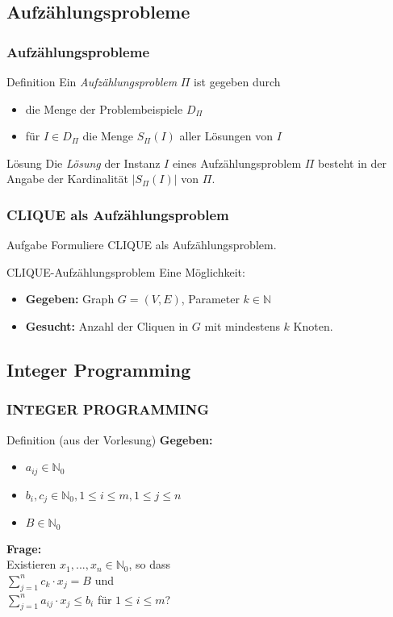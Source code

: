 \documentclass{beamer}
\begin{document}
{ \subsection{Aufzählungsprobleme}
\begin{frame}
 \frametitle{Aufzählungsprobleme}
 \begin{block}{Definition}
  Ein \emph{Aufzählungsproblem} $\Pi$ ist gegeben durch
  \begin{itemize}
   \item die Menge der Problembeispiele $D_\Pi$
   \item für $I \in D_\Pi$ die Menge $S_\Pi(I)$ aller Lösungen von $I$
  \end{itemize}
  \end{block}
  \begin{block}{Lösung}  
  Die \emph{Lösung} der Instanz $I$ eines Aufzählungsproblem $\Pi$ besteht in der Angabe der Kardinalität $|S_\Pi(I)|$ von $\Pi$.
 \end{block}
\end{frame}

 \begin{frame}
 \frametitle{CLIQUE als Aufzählungsproblem}
  \begin{block}{Aufgabe}
  Formuliere CLIQUE als Aufzählungsproblem.
\end{block}
\pause
\begin{block}{CLIQUE-Aufzählungsproblem}
Eine Möglichkeit:
\begin{itemize}
 \item \textbf{Gegeben: } Graph $G = (V,E)$, Parameter $k\in \mathbb{N}$
 \item \textbf{Gesucht: } Anzahl der Cliquen in $G$ mit mindestens $k$ Knoten.
 \end{itemize}
\end{block}
\end{frame}

\subsection{Integer Programming}
\begin{frame}
 \frametitle{INTEGER PROGRAMMING}
 \begin{block}{Definition (aus der Vorlesung)}
 \textbf{Gegeben: }
 \begin{itemize}
  \item $a_{ij} \in \mathbb{N}_0$
  \item $b_i, c_j \in \mathbb{N}_0, 1 \leq i \leq m, 1 \leq j \leq n$
  \item $B\in \mathbb{N}_0$
 \end{itemize}
\textbf{Frage: }\\
Existieren $x_1, ..., x_n \in \mathbb{N}_0$, so dass\\
 $\sum_{j=1}^n c_k \cdot x_j = B$ und \\
 $\sum_{j=1}^n a_{ij} \cdot x_j \leq b_i$ für $1 \leq i \leq m$?
 \end{block}
\end{frame}

}
\end{document}
